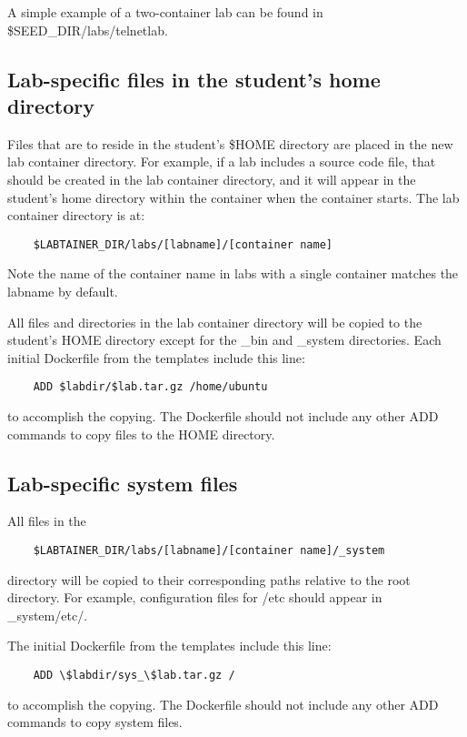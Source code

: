 \documentclass{article}
\begin{document}
A simple example of a two-container lab can be found in \$SEED\_DIR/labs/telnetlab. 


\subsection {Lab-specific files in the student's home directory}
Files that are to reside in the student's \$HOME directory are placed in the 
new lab container directory.  For example, if a lab includes a source code file, that
should be created in the lab container directory, and it will appear in the student's
home directory within the container when the container starts.  The lab container
directory is at:  

\begin{verbatim}
    $LABTAINER_DIR/labs/[labname]/[container name]
\end{verbatim}
Note the name of the container name in labs with a single container matches the labname by default.

All files and directories in the lab container directory will be copied to the student's HOME
directory except for the \_bin and \_system directories.
Each initial Dockerfile from the templates include this line:
\begin{verbatim}
    ADD $labdir/$lab.tar.gz /home/ubuntu
\end{verbatim}
to accomplish the copying. The Dockerfile should not include any other ADD commands
to copy files to the HOME directory.

\subsection{Lab-specific system files}
All files in the
\begin{verbatim}
    $LABTAINER_DIR/labs/[labname]/[container name]/_system
\end{verbatim}
directory will be copied to their corresponding paths relative to the root directory.
For example, configuration files for /etc should appear in \_system/etc/.

The initial Dockerfile from the templates include this line:
\begin{verbatim}
    ADD \$labdir/sys_\$lab.tar.gz /
\end{verbatim}
to accomplish the copying. The Dockerfile should not include any other ADD commands
to copy system files.
\end{document}
